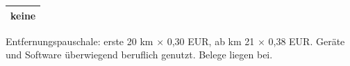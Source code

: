 \documentclass[10pt,a4paper]{article}
\renewcommand{\section}[1]{\par\vspace{11pt}{\large\bfseries #1}\par\nopagebreak\vspace{3pt}\nopagebreak}
\begin{document}
\section{5 Haushaltsnahe Dienstleistungen und Handwerker}
\begin{tabularx}{\textwidth}{@{}X@{}}\toprule
keine \\
\bottomrule\end{tabularx}

\vfill{\small\color{gray} Entfernungspauschale: erste 20 km $\times$ 0,30 EUR, ab km 21 $\times$ 0,38 EUR. Geräte und Software überwiegend beruflich genutzt. Belege liegen bei.}
\end{document}
